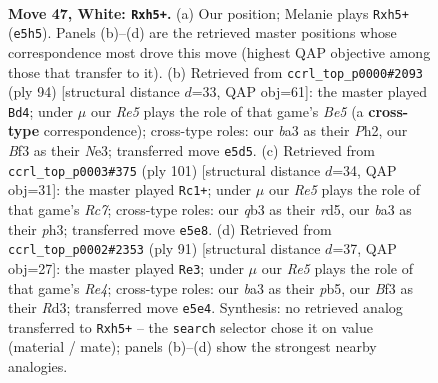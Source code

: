 \documentclass[11pt]{article}
\begin{document}
\clearpage

\begin{figure}[p]\centering
\begin{subfigure}{0.46\textwidth}\centering
\resizebox{\linewidth}{!}{%
\newchessgame
\chessboard[
  setfen={8/pp6/7k/4R2p/5P2/bq3BK1/8/8 w - - 0 47},
  showmover=false,
  pgfstyle=straightmove, color=movearrow, markmove={e5-h5}
]}
\caption{}
\end{subfigure}\hfill
\begin{subfigure}{0.46\textwidth}\centering
\resizebox{\linewidth}{!}{%
\newchessgame
\chessboard[
  setfen={8/R7/8/p3B2k/4K1pp/q3N3/7P/8 w - - 0 48},
  showmover=false,
  pgfstyle=straightmove, color=movearrow, markmove={e5-d4}
]}
\caption{}
\end{subfigure}
\\[4pt]
\begin{subfigure}{0.46\textwidth}\centering
\resizebox{\linewidth}{!}{%
\newchessgame
\chessboard[
  setfen={8/8/8/3Rbkp1/8/2P4P/2r2N2/6K1 b - - 8 51},
  showmover=false,
  pgfstyle=straightmove, color=movearrow, markmove={c2-c1}
]}
\caption{}
\end{subfigure}\hfill
\begin{subfigure}{0.46\textwidth}\centering
\resizebox{\linewidth}{!}{%
\newchessgame
\chessboard[
  setfen={8/8/5pk1/1P2r3/P4p1p/3r1P1P/2Q5/5K2 b - - 3 46},
  showmover=false,
  pgfstyle=straightmove, color=movearrow, markmove={e5-e3}
]}
\caption{}
\end{subfigure}
\caption{\textbf{Move 47, White: \texttt{Rxh5+}.} (a) Our position; Melanie plays \texttt{Rxh5+} (\texttt{e5h5}). Panels (b)--(d) are the retrieved master positions whose correspondence most drove this move (highest QAP objective among those that transfer to it). (b) Retrieved from \texttt{ccrl\_top\_p0000\#2093} (ply 94) [structural distance $d$=33, QAP obj=61]: the master played \texttt{Bd4}; under $\mu$ our \emph{Re5} plays the role of that game's \emph{Be5} (a \textbf{cross-type} correspondence); cross-type roles: our \emph{b}a3 as their \emph{P}h2, our \emph{B}f3 as their \emph{N}e3; transferred move \texttt{e5d5}. (c) Retrieved from \texttt{ccrl\_top\_p0003\#375} (ply 101) [structural distance $d$=34, QAP obj=31]: the master played \texttt{Rc1+}; under $\mu$ our \emph{Re5} plays the role of that game's \emph{Rc7}; cross-type roles: our \emph{q}b3 as their \emph{r}d5, our \emph{b}a3 as their \emph{p}h3; transferred move \texttt{e5e8}. (d) Retrieved from \texttt{ccrl\_top\_p0002\#2353} (ply 91) [structural distance $d$=37, QAP obj=27]: the master played \texttt{Re3}; under $\mu$ our \emph{Re5} plays the role of that game's \emph{Re4}; cross-type roles: our \emph{b}a3 as their \emph{p}b5, our \emph{B}f3 as their \emph{R}d3; transferred move \texttt{e5e4}. Synthesis: no retrieved analog transferred to \texttt{Rxh5+} -- the \texttt{search} selector chose it on value (material / mate); panels (b)--(d) show the strongest nearby analogies.}
\label{fig:thought-m92}
\end{figure}
\end{document}
